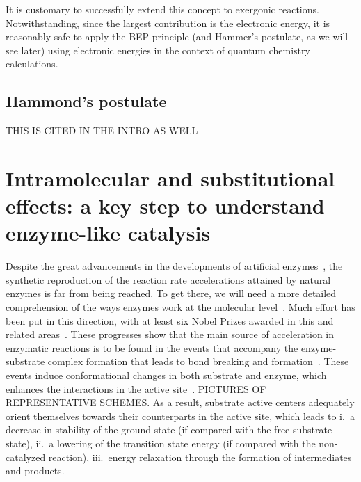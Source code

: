 
It is customary to successfully extend this concept to exergonic reactions.
Notwithstanding, since the largest contribution is the electronic energy,
it is reasonably
safe to apply the BEP principle (and Hammer's postulate,
as we will see later)
using electronic energies in the context of quantum chemistry calculations.

\subsection{Hammond's postulate}

THIS IS CITED IN THE INTRO AS WELL

\section{Intramolecular and substitutional effects:
  a key step to understand enzyme-like catalysis}

Despite the great advancements in the developments of artificial enzymes~\cite{Breslow_1995},
the synthetic reproduction of the reaction rate accelerations attained by
natural enzymes is far from being reached.
To get there,
we will need a more detailed comprehension of the ways enzymes
work at the molecular level~\cite{Catalysis_in_Chemistry_and_Enzymology}.
Much effort has been put in this direction,
with at least six Nobel Prizes
awarded in this and related areas~\cite{Nobel_1929,Nobel_1946,Nobel_1957,Nobel_1975,Nobel_1997,Nobel_2013}.
These progresses show that the main source of acceleration in
enzymatic reactions is to be found in the events that accompany the
enzyme-substrate complex formation that leads to bond breaking and
formation~\cite{Catalysis_in_Chemistry_and_Enzymology}.
These events induce conformational changes in both substrate and enzyme,
which
enhances the interactions in the active site~\cite{Fischer_1890,Fischer_1894,Koshland_1958,Dafforn_1971,Kirby_1996}.
PICTURES OF REPRESENTATIVE SCHEMES.\@
As a result,
substrate active centers adequately orient themselves towards
their counterparts in the active site,
which leads to
i.\ a decrease in stability of the ground state (if compared with the
free substrate state),
ii.\ a lowering of the transition state energy (if compared with the
non-catalyzed reaction),
iii.\ energy relaxation through the formation of intermediates and
products.

